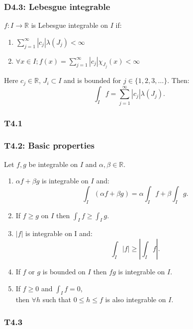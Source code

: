 \documentclass{article}
\begin{document}
\begin{multicols*}{3}
\subsubsection*{D4.3: Lebesgue integrable}
$f:I\rightarrow\mathbb{R}$ is Lebesgue integrable on $I$ if:
\begin{enumerate}
    \item $\displaystyle\sum_{j=1}^{\infty} |c_j| \lambda(J_j) < \infty$

    \item $\forall x\in I; f(x)=\displaystyle\sum_{j=1}^{\infty} |c_j| \chi_{J_j}(x)<\infty$
\end{enumerate}
Here $c_j \in \mathbb{R}$, $J_i \subset I$ and is bounded for 
$j \in \{1, 2, 3, \dots\}$. Then:
$$\int_I f = \sum_{j=1}^{\infty} |c_j| \lambda(J_j).$$

\subsubsection*{T4.1}

\subsubsection*{T4.2: Basic properties}
Let $f,g$ be integrable on $I$ and $\alpha,\beta\in\mathbb{R}$.
\begin{enumerate}
    \item $\alpha f+\beta g$ is integrable on $I$ and:
    $$\int_I(\alpha f+\beta g)
    =\alpha\int_I f+\beta\int_I g.$$

    \item If $f\geq g$ on $I$
    then $\displaystyle\int_I f\geq\int_I g$.

    \item $|f|$ is integrable on I and:
    $$\int_I |f|\geq\left|\int_I f\right|.$$

    \item If $f$ or $g$ is bounded on $I$
    then $fg$ is integrable on $I$.

    \item If $f\geq0$ and $\displaystyle\int_I f=0$, \\
    then $\forall h$ such that 
    $0\leq h\leq f$ is also integrable on $I$.
\end{enumerate}

\subsubsection*{T4.3}


\end{multicols*}
\end{document}
